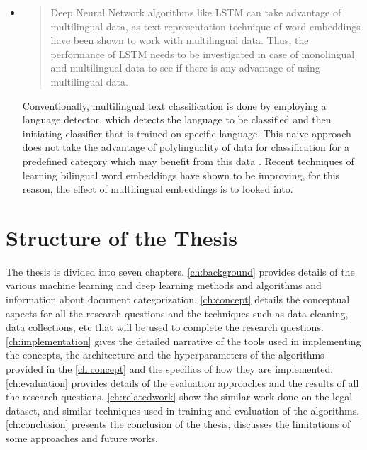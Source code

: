\begin{itemize}
    
    \item
    \begin{quote}
      Deep Neural Network algorithms like \gls{LSTM} can take advantage of multilingual data, as text representation technique of word embeddings have been shown to work with multilingual data. Thus, the performance of \gls{LSTM} needs to be investigated in case of monolingual and multilingual data to see if there is any advantage of using multilingual data.
    \end{quote}
     Conventionally, multilingual text classification is done by employing a language detector, which detects the language to be classified and then initiating classifier that is trained on specific language. This naive approach does not take the advantage of polylinguality of data for classification for a predefined category which may benefit from this data \cite{Wei:2014:EPD:2566999.2567111}. Recent techniques of learning bilingual word embeddings \cite{D13-1141,NIPS2014_5270} have shown to be improving, for this reason, the effect of multilingual embeddings is to looked into. 
\end{itemize}

\section{Structure of the Thesis}
The thesis is divided into seven chapters. \ref{ch:background} provides details of the various machine learning and deep learning methods and algorithms and information about document categorization. \ref{ch:concept} details the conceptual aspects for all the research questions and the techniques such as data cleaning, data collections, etc that will be used to complete the research questions. \ref{ch:implementation} gives the detailed narrative of the tools used in implementing the concepts, the architecture and the hyperparameters of the algorithms provided in the \ref{ch:concept} and the specifics of how they are implemented. \ref{ch:evaluation} provides details of the evaluation approaches and the results of all the research questions.  \ref{ch:relatedwork} show the similar work done on the legal dataset, and similar techniques used in training and evaluation of the algorithms. \ref{ch:conclusion} presents the conclusion of the thesis, discusses the limitations of some approaches and future works. 